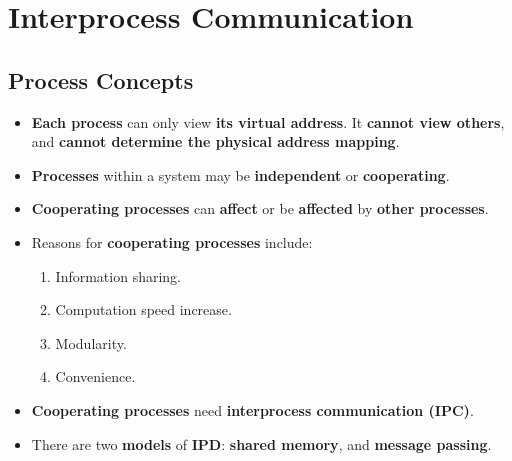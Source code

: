 \documentclass{article}
\begin{document}
    \section*{Interprocess Communication}

    \subsection*{Process Concepts}
    \begin{itemize}
        \item \textbf{Each process} can only view \textbf{its virtual address}. It \textbf{cannot view others}, and \textbf{cannot determine the physical address mapping}.
        \item \textbf{Processes} within a system may be \textbf{independent} or \textbf{cooperating}.
        \item \textbf{Cooperating processes} can \textbf{affect} or be \textbf{affected} by \textbf{other processes}.
        \item Reasons for \textbf{cooperating processes} include:
        \begin{enumerate}
            \item Information sharing.
            \item Computation speed increase.
            \item Modularity.
            \item Convenience.
        \end{enumerate}
        \item \textbf{Cooperating processes} need \textbf{interprocess communication (IPC)}.
        \item There are two \textbf{models} of \textbf{IPD}: \textbf{shared memory}, and \textbf{message passing}.
    \end{itemize}
\end{document}
